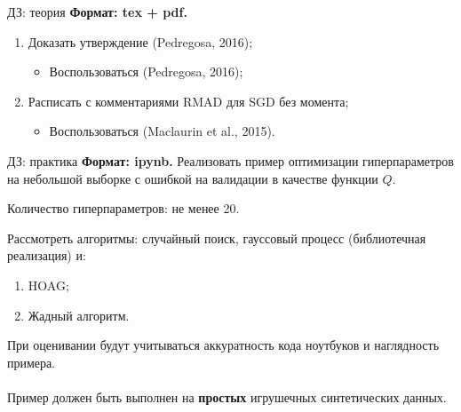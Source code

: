 \documentclass[10pt,pdf,utf8,russian,aspectratio=169]{beamer}
\begin{document}
\begin{frame}{ДЗ: теория}
\textbf{Формат: tex + pdf.}

\begin{enumerate}
\item Доказать утверждение (Pedregosa, 2016);
\begin{itemize}
\item Воспользоваться  (Pedregosa, 2016);
\end{itemize}

\item Расписать с комментариями RMAD для SGD без момента;
\begin{itemize}
\item Воспользоваться (Maclaurin et al., 2015).
\end{itemize}
\end{enumerate}
\end{frame}

\begin{frame}{ДЗ: практика}
\textbf{Формат: ipynb.}
Реализовать пример оптимизации гиперпараметров на небольшой выборке с ошибкой на валидации в качестве функции $Q$.

Количество гиперпараметров: не менее 20.

Рассмотреть алгоритмы: случайный поиск, гауссовый процесс (библиотечная реализация) и:
\begin{enumerate}
\item HOAG;

\item Жадный алгоритм.

\end{enumerate}

При оценивании будут учитываться аккуратность кода ноутбуков и наглядность примера.\\~\\
Пример должен быть выполнен на  \textbf{простых} игрушечных синтетических данных.
\end{frame}
\end{document}
